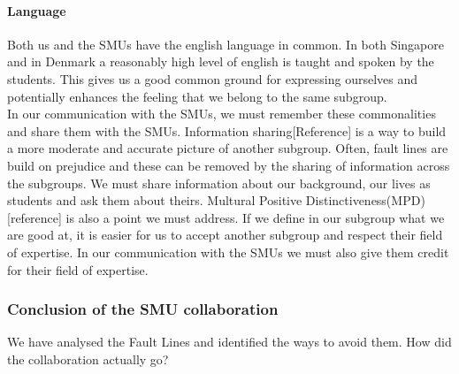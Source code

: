 \documentclass[a4paper,11pt,report]{article}
\begin{document}
{\paragraph{Language}
Both us and the SMUs have the english language in common. In both Singapore and in Denmark a reasonably high level of english is taught and spoken by the students. This gives us a good common ground for expressing ourselves and potentially enhances the feeling that we belong to the same subgroup. \\

In our communication with the SMUs, we must remember these commonalities and share them with the SMUs. Information sharing[Reference] is a way to build a more moderate and accurate picture of another subgroup. Often, fault lines are build on prejudice and these can be removed by the sharing of information across the subgroups. We must share information about our background, our lives as students and ask them about theirs. Multural Positive Distinctiveness(MPD)[reference] is also a point we must address. If we define in our subgroup what we are good at, it is easier for us to accept another subgroup and respect their field of expertise. In our communication with the SMUs we must also give them credit for their field of expertise. \\

\subsubsection{Conclusion of the SMU collaboration}

We have analysed the Fault Lines and identified the ways to avoid them. How did the collaboration actually go? \\

}
\end{document}
